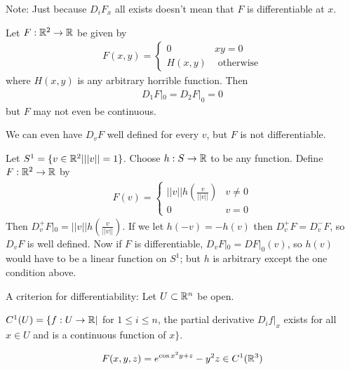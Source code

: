 \documentclass[a4paper]{article}
\begin{document}
Note: Just because $D_i F_x$ all exists doesn't mean that $F$ is differentiable at $x$.

\begin{eg}
Let $F:\mathbb{R}^2 \to \mathbb{R}$ be given by
\begin{equation*}
\begin{aligned}
F(x,y) = \left\{
\begin{array}{ll}
0 & xy=0\\
H(x,y) & \text{ otherwise}
\end{array}\right.
\end{aligned}
\end{equation*}
where $H(x,y)$ is any arbitrary horrible function. Then
\begin{equation*}
\begin{aligned}
D_1F|_0 = D_2F|_0 = 0
\end{aligned}
\end{equation*}
but $F$ may not even be continuous.
\end{eg}

We can even have $D_v F$ well defined for every $v$, but $F$ is not differentiable.
\begin{eg}
Let $S^1 = \{v \in \mathbb{R}^2 | ||v||=1\}$. Choose $h:S  \to \mathbb{R}$ to be any function. Define $F: \mathbb{R}^2 \to \mathbb{R}$ by
\begin{equation*}
\begin{aligned}
F(v)=\left\{\begin{array}{ll}
||v||h(\frac{v}{||v||}) & v \neq 0\\
0 & v = 0
\end{array}\right.
\end{aligned}
\end{equation*}
Then $D_v^+ F|_0 = ||v||h(\frac{v}{||v||})$. If we let $h(-v)=-h(v)$ then $D_v^+ F = D_v^- F$, so $D_v F$ is well defined. Now if $F$ is differentiable, $D_v F|_0 = DF|_0(v)$, so $h(v)$ would have to be a linear function on $S^1$; but $h$ is arbitrary except the one condition above.
\end{eg}

A criterion for differentiability:
Let $U \subset \mathbb{R}^n$ be open.

\begin{defi}
$C^1(U)=\{f:U \to \mathbb{R}|$ for $1 \leq i \leq n$, the partial derivative $D_i f|_x$ exists for all $x \in U$ and is a continuous function of $x\}$.
\end{defi}

\begin{eg}
\begin{equation*}
\begin{aligned}
F(x,y,z) = e^{\cos x^2y+z}-y^2z \in C^1(\mathbb{R}^3)
\end{aligned}
\end{equation*}
\end{eg}
\end{document}
